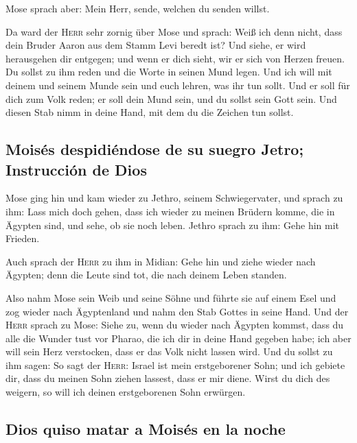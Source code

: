 Mose sprach aber: Mein Herr, sende, welchen du senden
willst.

 Da ward der \textsc{Herr} sehr zornig über Mose und
sprach: Weiß ich denn nicht, dass dein Bruder Aaron aus dem Stamm Levi
beredt ist? Und siehe, er wird herausgehen dir entgegen; und wenn er
dich sieht, wir er sich von Herzen freuen.  Du sollst zu
ihm reden und die Worte in seinen Mund legen. Und ich will mit deinem
und seinem Munde sein und euch lehren, was ihr tun sollt.
 Und er soll für dich zum Volk reden; er soll dein Mund
sein, und du sollst sein Gott sein.  Und diesen Stab nimm
in deine Hand, mit dem du die Zeichen tun sollst.

\hypertarget{moisuxe9s-despidiuxe9ndose-de-su-suegro-jetro-instrucciuxf3n-de-dios}{%
\subsection{Moisés despidiéndose de su suegro Jetro; Instrucción de
Dios}\label{moisuxe9s-despidiuxe9ndose-de-su-suegro-jetro-instrucciuxf3n-de-dios}}

 Mose ging hin und kam wieder zu Jethro, seinem
Schwiegervater, und sprach zu ihm: Lass mich doch gehen, dass ich wieder
zu meinen Brüdern komme, die in Ägypten sind, und sehe, ob sie noch
leben. Jethro sprach zu ihm: Gehe hin mit Frieden.

 Auch sprach der \textsc{Herr} zu ihm in Midian: Gehe hin
und ziehe wieder nach Ägypten; denn die Leute sind tot, die nach deinem
Leben standen.

 Also nahm Mose sein Weib und seine Söhne und führte sie
auf einem Esel und zog wieder nach Ägyptenland und nahm den Stab Gottes
in seine Hand.  Und der \textsc{Herr} sprach zu Mose:
Siehe zu, wenn du wieder nach Ägypten kommst, dass du alle die Wunder
tust vor Pharao, die ich dir in deine Hand gegeben habe; ich aber will
sein Herz verstocken, dass er das Volk nicht lassen wird.
 Und du sollst zu ihm sagen: So sagt der \textsc{Herr}:
Israel ist mein erstgeborener Sohn;  und ich gebiete dir,
dass du meinen Sohn ziehen lassest, dass er mir diene. Wirst du dich des
weigern, so will ich deinen erstgeborenen Sohn erwürgen.

\hypertarget{dios-quiso-matar-a-moisuxe9s-en-la-noche}{%
\subsection{Dios quiso matar a Moisés en la
noche}\label{dios-quiso-matar-a-moisuxe9s-en-la-noche}}

